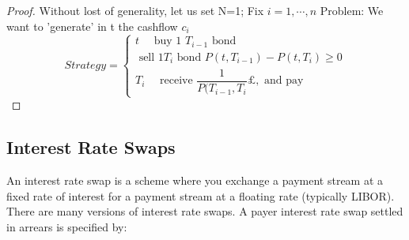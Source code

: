 \begin{proof}
 Without lost of generality, let us set N=1; Fix $i=1, \cdots, n $
Problem: We want to 'generate' in t the cashflow $c_i$
\begin{equation}
Strategy = \begin{cases}
   t \quad \text{ buy 1 }T_{i-1}\text{ bond}\\  
\text{ sell 1} T_{i} \text{ bond } P(t,T_{i-1}) - P(t,T_{i}) \geq 0\\
   T_i \quad \text{ receive } \dfrac{1}{P(T_{i-1}, T_{i}} \pounds, \text{ and pay }  \end{cases}
\end{equation}
\end{proof}

\subsection{Interest Rate Swaps}
An interest rate swap is a scheme where you exchange a payment stream at a fixed
rate of interest for a payment stream at a floating rate (typically LIBOR).
There are many versions of interest rate swaps. A payer interest rate swap settled
in arrears is specified by: